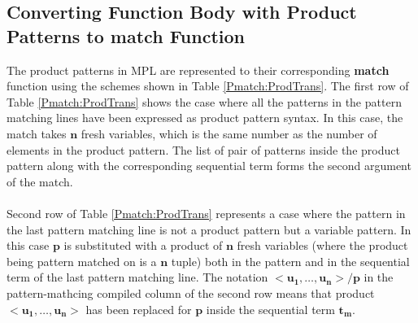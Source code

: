 \documentclass[11pt]{article}
\begin{document}
\subsection {Converting Function Body with Product Patterns to match Function}
The product patterns in MPL are represented to their corresponding {\bf match} function using the schemes shown in Table \ref {Pmatch:ProdTrans}. The first row of Table \ref {Pmatch:ProdTrans} shows the case where all the patterns in the pattern matching lines have been expressed as product pattern syntax. In this case, the match takes $\mathbf{n}$ fresh variables, which is the same number as the number of elements in the product pattern. The list of pair of patterns inside the product pattern along with the corresponding sequential term forms the second argument of the match.
~~\\~~\\
Second row  of Table \ref {Pmatch:ProdTrans} represents a case where the pattern in the last pattern matching line is not a product pattern but a variable pattern. In this case $\mathbf{p}$ is substituted with a product of $\mathbf{n}$ fresh variables (where the product being pattern matched on is a $\mathbf{n}$ tuple) both in the pattern and in the sequential term of the last pattern matching line. The notation $\mathbf{<u_1,\ldots,u_n>/p}$ in the pattern-mathcing compiled column of the second row means that product $\mathbf{<u_1,\ldots,u_n>}$ has been replaced 
for $\mathbf {p}$ inside the sequential term $\mathbf{t_m}$. 
\end{document}
